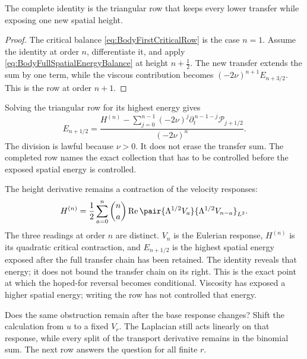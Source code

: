 The complete identity is the triangular row that keeps every lower transfer
while exposing one new spatial height.
\begin{proof}
The critical balance \eqref{eq:BodyFirstCriticalRow} is the case \(n=1\).
Assume the identity at order \(n\), differentiate it, and apply
\eqref{eq:BodyFullSpatialEnergyBalance} at height \(n+\tfrac12\).  The new
transfer extends the sum by one term, while the viscous contribution becomes
\((-2\nu)^{n+1}E_{n+3/2}\).  This is the row at order \(n+1\).
\end{proof}
Solving the triangular row for its highest energy gives
\begin{equation}\label{eq:BodyCompletedCriticalRow}
  E_{n+1/2}
  =\frac{
    H^{(n)}-
    \displaystyle\sum_{j=0}^{n-1}
    (-2\nu)^j\partial_t^{\,n-1-j}\mathcal P_{j+1/2}
  }{(-2\nu)^n}.
\end{equation}
The division is lawful because \(\nu>0\).  It does not erase the transfer
sum.  The completed row names the exact collection that has to be controlled
before the exposed spatial energy is controlled.

The height derivative remains a contraction of the velocity responses:
\begin{equation}\label{eq:BodyHeightDerivativeVelocityContraction}
  H^{(n)}
  =\frac12\sum_{a=0}^{n}\binom{n}{a}
  \operatorname{Re}
  \pair{\Lambda^{1/2}V_a}
       {\Lambda^{1/2}V_{n-a}}_{L^2}.
\end{equation}
The three readings at order \(n\) are distinct.  \(V_n\) is the Eulerian
response, \(H^{(n)}\) is its quadratic critical contraction, and
\(E_{n+1/2}\) is the highest spatial energy exposed after the full transfer
chain has been retained.  The identity reveals that energy; it does not bound
the transfer chain on its right.  This is the exact point at which the hoped-for
reversal becomes conditional.  Viscosity has exposed a higher spatial energy;
writing the row has not controlled that energy.

Does the same obstruction remain after the base response changes?  Shift the
calculation from \(u\) to a fixed \(V_r\).  The Laplacian still acts linearly on
that response, while every split of the transport derivative remains in the
binomial sum.  The next row answers the question for all finite \(r\).
